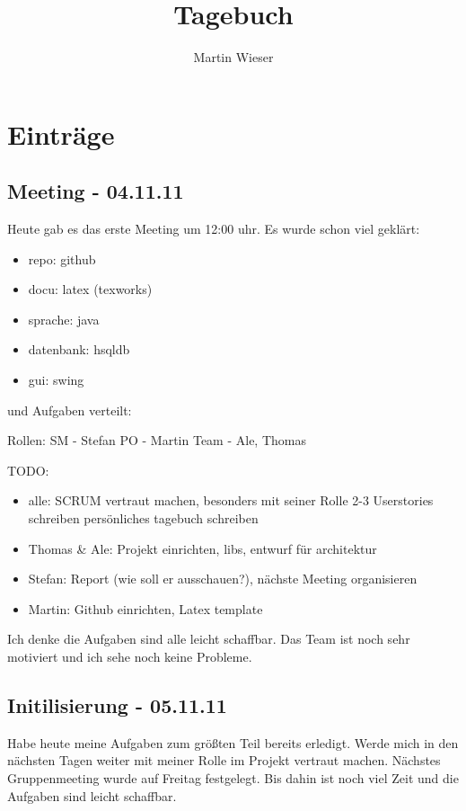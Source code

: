 \documentclass[11pt]{scrartcl}
\title{Tagebuch}
\author{Martin Wieser}
\begin{document}
\maketitle

\section{Einträge}

\subsection{Meeting - 04.11.11}

Heute gab es das erste Meeting um 12:00 uhr. Es wurde schon viel geklärt:
\begin{itemize}
\item repo:                  github
\item docu:                  latex (texworks)
\item sprache:             java
\item datenbank:         hsqldb
\item gui:                    swing
\end{itemize}
und Aufgaben verteilt:

Rollen:
SM - Stefan
PO - Martin
Team - Ale, Thomas

TODO:
\begin{itemize}
\item alle:       SCRUM vertraut machen, besonders mit seiner Rolle
              2-3 Userstories schreiben
	       persönliches tagebuch schreiben
\item Thomas \& Ale: Projekt einrichten, libs, entwurf für architektur
\item Stefan: Report (wie soll er ausschauen?), nächste Meeting organisieren
\item Martin: Github einrichten, Latex template
\end{itemize}
Ich denke die Aufgaben sind alle leicht schaffbar. Das Team ist noch sehr motiviert
und ich sehe noch keine Probleme.

\subsection{Initilisierung - 05.11.11}

Habe heute meine Aufgaben zum größten Teil bereits erledigt. Werde mich in den nächsten Tagen weiter mit meiner Rolle im Projekt vertraut machen. Nächstes Gruppenmeeting wurde auf Freitag festgelegt. Bis dahin ist noch viel Zeit und die Aufgaben sind leicht schaffbar.
\end{document}
